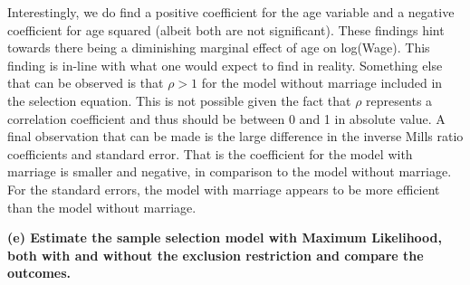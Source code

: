 \documentclass[
]{article}
\newenvironment{Shaded}{\begin{snugshade}}{\end{snugshade}}
\newcommand{\CommentTok}[1]{\textcolor[rgb]{0.56,0.35,0.01}{\textit{#1}}}
\newcommand{\DataTypeTok}[1]{\textcolor[rgb]{0.13,0.29,0.53}{#1}}
\newcommand{\DecValTok}[1]{\textcolor[rgb]{0.00,0.00,0.81}{#1}}
\newcommand{\KeywordTok}[1]{\textcolor[rgb]{0.13,0.29,0.53}{\textbf{#1}}}
\newcommand{\NormalTok}[1]{#1}
\newcommand{\OperatorTok}[1]{\textcolor[rgb]{0.81,0.36,0.00}{\textbf{#1}}}
\newcommand{\StringTok}[1]{\textcolor[rgb]{0.31,0.60,0.02}{#1}}
\begin{document}
Interestingly, we do find a positive coefficient for the age variable
and a negative coefficient for age squared (albeit both are not
significant). These findings hint towards there being a diminishing
marginal effect of age on log(Wage). This finding is in-line with what
one would expect to find in reality. Something else that can be observed
is that \(\rho>1\) for the model without marriage included in the
selection equation. This is not possible given the fact that \(\rho\)
represents a correlation coefficient and thus should be between 0 and 1
in absolute value. A final observation that can be made is the large
difference in the inverse Mills ratio coefficients and standard error.
That is the coefficient for the model with marriage is smaller and
negative, in comparison to the model without marriage. For the standard
errors, the model with marriage appears to be more efficient than the
model without marriage.

\textbf{(e) Estimate the sample selection model with Maximum Likelihood,
both with and without the exclusion restriction and compare the
outcomes.}

\begin{Shaded}
\end{Shaded}
\end{document}
